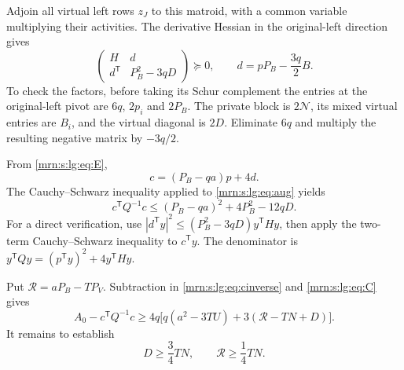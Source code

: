 \documentclass[11pt,a4paper]{article}
\theoremstyle{remark}\newtheorem{remark}[theorem]{Remark}
\begin{document}
Adjoin all virtual left rows $z_J$ to this matroid, with a common variable multiplying their activities. The derivative Hessian in the original-left direction gives
\begin{equation}\label{mrn:s:lg:eq:aug}
 \begin{pmatrix}
 H&d\\ d^{\mathsf T}&P_B^2-3qD
 \end{pmatrix}\succeq0,
 \qquad d=pP_B-\frac{3q}{2}B.
\end{equation}
To check the factors, before taking its Schur complement the entries at the original-left pivot are $6q$, $2p_i$ and $2P_B$. The private block is $2\mathcal N$, its mixed virtual entries are $B_i$, and the virtual diagonal is $2D$. Eliminate $6q$ and multiply the resulting negative matrix by $-3q/2$.

From \eqref{mrn:s:lg:eq:E},
\[
 c=(P_B-qa)p+4d.
\]
The Cauchy--Schwarz inequality applied to \eqref{mrn:s:lg:eq:aug} yields
\begin{equation}\label{mrn:s:lg:eq:cinverse}
 c^{\mathsf T}Q^{-1}c
 \le(P_B-qa)^2+4P_B^2-12qD.
\end{equation}
For a direct verification, use
$|d^{\mathsf T}y|^2\le(P_B^2-3qD)y^{\mathsf T}Hy$,
then apply the two-term Cauchy--Schwarz inequality to $c^{\mathsf T}y$.
The denominator is $y^{\mathsf T}Qy=(p^{\mathsf T}y)^2+4y^{\mathsf T}Hy$.

Put $\mathcal R=aP_B-TP_V$. Subtraction in \eqref{mrn:s:lg:eq:cinverse} and \eqref{mrn:s:lg:eq:C} gives
\begin{equation}\label{mrn:s:lg:eq:reduction}
 A_0-c^{\mathsf T}Q^{-1}c
 \ge4q\bigl[q(a^2-3TU)+3(\mathcal R-TN+D)\bigr].
\end{equation}
It remains to establish
\begin{equation}\label{mrn:s:lg:eq:twobounds}
 D\ge\frac34TN,\qquad \mathcal R\ge\frac14TN.
\end{equation}
\end{document}
